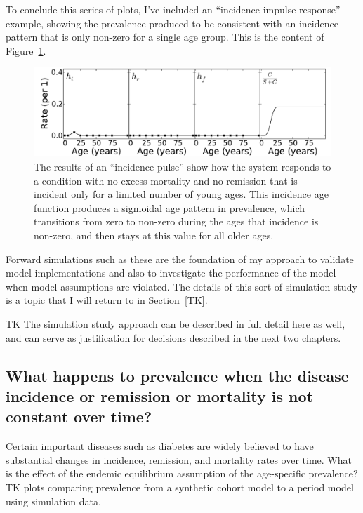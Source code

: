 To conclude this series of plots, I've included an ``incidence impulse response'' example, showing the prevalence produced to be consistent with an incidence pattern that is only non-zero for a single age group. This is the content of Figure~\ref{forward-sim-incidence-pluse}.

\begin{figure}[h]
\begin{center}

\includegraphics[width=\textwidth]{forward-sim-incidence_pulse.pdf}

\caption{The results of an ``incidence pulse'' show how the system responds to a condition with no excess-mortality and no remission that is incident only for a limited number of young ages.  This incidence age function produces a sigmoidal age pattern in prevalence, which transitions from zero to non-zero during the ages that incidence is non-zero, and then stays at this value for all older ages.}
\label{forward-sim-incidence-pluse}
\end{center}
\end{figure}



Forward simulations such as these are the foundation of my approach to validate model implementations and also to investigate the performance of the model when model assumptions are violated. The details of this sort of simulation study is a topic that I will return to in Section~\ref{TK}.

TK The simulation study approach can be described in full detail here as well, and can serve as justification for decisions described in the next two chapters.

\subsection{What happens to prevalence when the disease incidence or remission or mortality is not constant over time?}

Certain important diseases such as diabetes are widely believed to have substantial changes in incidence, remission, and mortality rates over time.  What is the effect of the endemic equilibrium assumption of the age-specific prevalence? TK plots comparing prevalence from a synthetic cohort model to a period model using simulation data.

